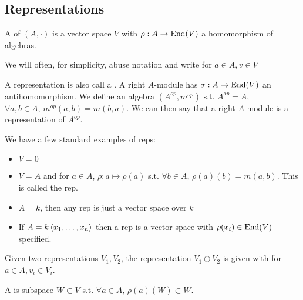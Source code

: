 \documentclass{article}
\begin{document}
\subsection{Representations}

\begin{definition}
A  of $(A,\cdot)$ is a vector space $V$ with $\rho : A \to \operatorname{End}(V)$ a homomorphism of algebras. 
\end{definition}

\begin{notation}
We will often, for simplicity, abuse notation and write for $a \in A, v \in V$
\end{notation}

\begin{remark}
A representation is also call a . A right $A$-module has $\sigma:A \to \operatorname{End}(V)$ an antihomomorphism. We define an algebra $(A^{op},m^{op})$ s.t. $A^{op} = A$, $\forall a,b \in A, \, m^{op}(a,b) = m(b,a)$. We can then say that a right $A$-module is a representation of $A^{op}$. 
\end{remark}

\begin{example}
We have a few standard examples of reps:
\begin{itemize}
    \item $V=0$
    \item $V=A$ and for $a \in A$, $\rho: a \mapsto \rho(a)$ s.t. $\forall b \in A, \, \rho(a)(b) = m(a,b)$. This is called the  rep.
    \item $A=k$, then any rep is just a vector space over $k$
    \item If $A = k\left\langle x_1,\dots, x_n \right\rangle$ then a rep is a vector space with $\rho(x_i) \in \operatorname{End}(V)$ specified. 
\end{itemize}
\end{example}

\begin{definition}
Given two representations $V_1, V_2$, the  representation $V_1 \oplus V_2$ is given with 
for $a \in A, v_i \in V_i$. 
\end{definition}

\begin{definition}
A  is  subspace $W \subset V$ s.t. $\forall a \in A, \, \rho(a)(W) \subset W$. 
\end{definition}
\end{document}
